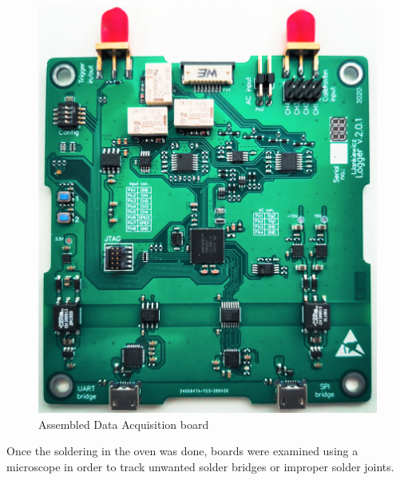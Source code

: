 \documentclass[12pt,a4paper]{article}
\begin{document}
\begin{figure}[ht!]
\includegraphics[scale=0.17]{logger.jpg}
\caption{Assembled Data Acquisition board}
\label{fig:loggerreal}
\end{figure}

Once the soldering in the oven was done, boards were examined using a microscope in order to track unwanted solder bridges or improper solder joints.
\par
\end{document}
